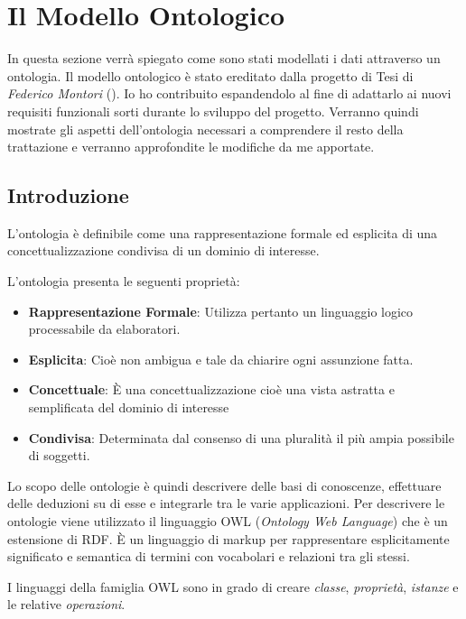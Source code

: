 \section{Il Modello Ontologico}

In questa sezione verrà spiegato come sono stati modellati i dati attraverso un ontologia. Il modello ontologico è stato ereditato dalla progetto di Tesi di \emph{Federico Montori} (\cite{montori2012}). Io ho contribuito espandendolo al fine di adattarlo ai nuovi requisiti funzionali sorti durante lo sviluppo del progetto. Verranno quindi mostrate gli aspetti dell'ontologia necessari a comprendere il resto della trattazione e verranno approfondite le modifiche da me apportate.

\subsection{Introduzione}

L'ontologia è definibile come una rappresentazione formale ed esplicita di una concettualizzazione condivisa di un dominio di interesse.

L'ontologia presenta le seguenti proprietà:

\begin{itemize}
	\item \textbf{Rappresentazione Formale}: Utilizza pertanto un linguaggio logico processabile da elaboratori.
	\item \textbf{Esplicita}: Cioè non ambigua e tale da chiarire ogni assunzione fatta.
	\item \textbf{Concettuale}: È una concettualizzazione cioè una vista astratta e semplificata del dominio di interesse
	\item \textbf{Condivisa}: Determinata dal consenso di una pluralità il più ampia possibile di soggetti.
\end{itemize}

Lo scopo delle ontologie è quindi descrivere delle basi di conoscenze, effettuare delle deduzioni su di esse e integrarle tra le varie applicazioni. Per descrivere le ontologie viene utilizzato il linguaggio OWL (\emph{Ontology Web Language}) che è un estensione di RDF. È un linguaggio di markup per rappresentare esplicitamente significato e semantica di termini con vocabolari e relazioni tra gli stessi.

I linguaggi della famiglia OWL sono in grado di creare \emph{classe}, \emph{proprietà}, \emph{istanze} e le relative \emph{operazioni}.


